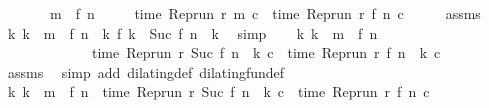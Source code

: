 \begin{isabellebody}
\ \ \ \ \ \ \ {\isacartoucheopen}m\ {\isachargreater}\ f\ n{\isacartoucheclose}\isanewline
\ \ \ \ \ {\isacartoucheopen}time\ {\isacharparenleft}{\isacharparenleft}Rep{\isacharunderscore}run\ r{\isacharparenright}\ m\ c{\isacharparenright}\ {\isacharequal}\ time\ {\isacharparenleft}{\isacharparenleft}Rep{\isacharunderscore}run\ r{\isacharparenright}\ {\isacharparenleft}f\ n{\isacharparenright}\ c{\isacharparenright}{\isacartoucheclose}\isanewline
%
\isadelimproof
%
\endisadelimproof
%
\isatagproof
{}\isamarkupfalse%
\ {\isacharminus}\isanewline
\ \ \isamarkupfalse%
\ assms\ \isamarkupfalse%
\ {\isacartoucheopen}{\isasymforall}k{\isachardot}\ k\ {\isacharless}\ m\ {\isacharminus}\ {\isacharparenleft}f\ n{\isacharparenright}\ {\isasymlongrightarrow}\ {\isacharparenleft}{\isasymnexists}k\ f\ k\ {\isacharequal}\ Suc\ {\isacharparenleft}{\isacharparenleft}f\ n{\isacharparenright}\ {\isacharplus}\ k{\isacharparenright}{\isacharparenright}{\isacartoucheclose}\ \isamarkupfalse%
\ simp\isanewline
\ \ \isamarkupfalse%
\ {\isacartoucheopen}{\isasymforall}k{\isachardot}\ k\ {\isacharless}\ m\ {\isacharminus}\ {\isacharparenleft}f\ n{\isacharparenright}\isanewline
\ \ \ \ \ \ \ \ \ \ \ \ {\isasymlongrightarrow}\ time\ {\isacharparenleft}{\isacharparenleft}Rep{\isacharunderscore}run\ r{\isacharparenright}\ {\isacharparenleft}Suc\ {\isacharparenleft}{\isacharparenleft}f\ n{\isacharparenright}\ {\isacharplus}\ k{\isacharparenright}{\isacharparenright}\ c{\isacharparenright}\ {\isacharequal}\ time\ {\isacharparenleft}{\isacharparenleft}Rep{\isacharunderscore}run\ r{\isacharparenright}\ {\isacharparenleft}{\isacharparenleft}f\ n{\isacharparenright}\ {\isacharplus}\ k{\isacharparenright}\ c{\isacharparenright}{\isacartoucheclose}\isanewline
\ \ \ \ \isamarkupfalse%
\ assms{\isacharparenleft}{}{\isacharparenright}\ \isamarkupfalse%
\ {\isacharparenleft}simp\ add{\isacharcolon}\ dilating{\isacharunderscore}def\ dilating{\isacharunderscore}fun{\isacharunderscore}def{\isacharparenright}\isanewline
\ \ \isamarkupfalse%
\ {\isacharasterisk}{\isacharcolon}{\isacartoucheopen}{\isasymforall}k{\isachardot}\ k\ {\isacharless}\ m\ {\isacharminus}\ {\isacharparenleft}f\ n{\isacharparenright}\ {\isasymlongrightarrow}\ time\ {\isacharparenleft}{\isacharparenleft}Rep{\isacharunderscore}run\ r{\isacharparenright}\ {\isacharparenleft}Suc\ {\isacharparenleft}{\isacharparenleft}f\ n{\isacharparenright}\ {\isacharplus}\ k{\isacharparenright}{\isacharparenright}\ c{\isacharparenright}\ {\isacharequal}\ time\ {\isacharparenleft}{\isacharparenleft}Rep{\isacharunderscore}run\ r{\isacharparenright}\ {\isacharparenleft}f\ n{\isacharparenright}\ c{\isacharparenright}{\isacartoucheclose}\isanewline

\end{isabellebody}
